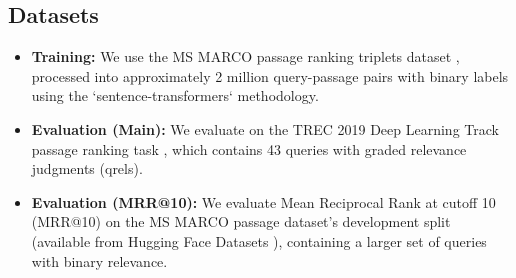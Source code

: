 \documentclass[conference]{IEEEtran}
\begin{document}
\subsection{Datasets}
\begin{itemize}
    \item \textbf{Training:} We use the MS MARCO passage ranking triplets dataset \cite{DBLP:journals/corr/NguyenRSGTMD16}, processed into approximately 2 million query-passage pairs with binary labels using the `sentence-transformers` methodology.
    \item \textbf{Evaluation (Main):} We evaluate on the TREC 2019 Deep Learning Track passage ranking task \cite{craswell2020overview}, which contains 43 queries with graded relevance judgments (qrels).
    \item \textbf{Evaluation (MRR@10):} We evaluate Mean Reciprocal Rank at cutoff 10 (MRR@10) on the MS MARCO passage dataset's development split (available from Hugging Face Datasets \cite{DBLP:journals/corr/NguyenRSGTMD16}), containing a larger set of queries with binary relevance.
\end{itemize}
\end{document}
